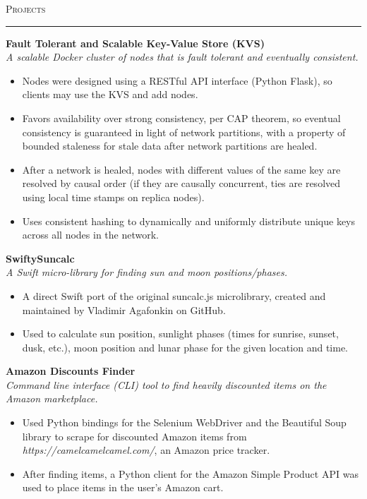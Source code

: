 \documentclass{res}
\begin{document}
\begin{resume}
\textsc{{\Large Projects}}
\vspace{0.5mm}
\hrule width18.5cm
\textbf{Fault Tolerant and Scalable Key-Value Store (KVS)}\\
\textit{A scalable Docker cluster of nodes that is fault tolerant and eventually consistent.}
	\vspace{2mm}
	\begin{itemize}
		\item Nodes were designed using a RESTful API interface (Python Flask), so clients may use the KVS and add nodes.
		\item Favors availability over strong consistency, per CAP theorem, so eventual consistency is guaranteed in light of network partitions, with a property of bounded staleness for stale data after network partitions are healed.
		\item After a network is healed, nodes with different values of the same key are resolved by causal order (if they are causally concurrent, ties are resolved using local time stamps on replica nodes).
		\item Uses consistent hashing to dynamically and uniformly distribute unique keys across all nodes in the network.
	\end{itemize}
\textbf{SwiftySuncalc}\\
\textit{A Swift micro-library for finding sun and moon positions/phases.}
	\vspace{2mm}
	\begin{itemize}
		\item A direct Swift port of the original suncalc.js microlibrary, created and maintained by Vladimir Agafonkin on GitHub.
		\item Used to calculate sun position, sunlight phases (times for sunrise, sunset, dusk, etc.), moon position and lunar phase for the given location and time.
	\end{itemize}
\textbf{Amazon Discounts Finder}\\
\textit{Command line interface (CLI) tool to find heavily discounted items on the Amazon marketplace.}
	\vspace{2mm}
	\begin{itemize}
		\item Used Python bindings for the Selenium WebDriver and the Beautiful Soup library to scrape for discounted Amazon items from \textit{https://camelcamelcamel.com/}, an Amazon price tracker.
		\item After finding items, a Python client for the Amazon Simple Product API was used to place items in the user's Amazon cart.
	\end{itemize}


\end{resume}
\end{document}
